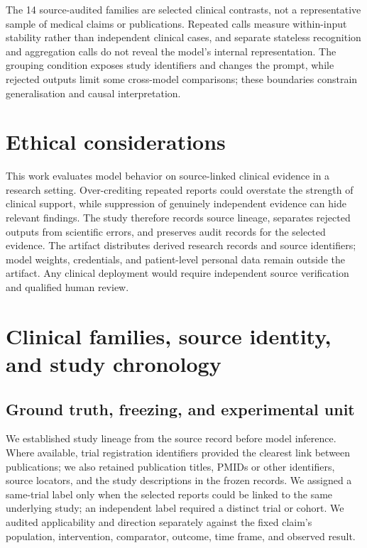\documentclass[11pt]{article}
\begin{document}
The 14 source-audited families are selected clinical contrasts, not a representative sample of medical claims or publications. Repeated calls measure within-input stability rather than independent clinical cases, and separate stateless recognition and aggregation calls do not reveal the model's internal representation. The grouping condition exposes study identifiers and changes the prompt, while rejected outputs limit some cross-model comparisons; these boundaries constrain generalisation and causal interpretation.

\section*{Ethical considerations}

This work evaluates model behavior on source-linked clinical evidence in a research setting. Over-crediting repeated reports could overstate the strength of clinical support, while suppression of genuinely independent evidence can hide relevant findings. The study therefore records source lineage, separates rejected outputs from scientific errors, and preserves audit records for the selected evidence. The artifact distributes derived research records and source identifiers; model weights, credentials, and patient-level personal data remain outside the artifact. Any clinical deployment would require independent source verification and qualified human review.



\appendix
\raggedbottom

\section{Clinical families, source identity, and study chronology}
\label{app:family-inventory}

\subsection{Ground truth, freezing, and experimental unit}
\label{app:study-chronology}

We established study lineage from the source record before model inference. Where available, trial registration identifiers provided the clearest link between publications; we also retained publication titles, PMIDs or other identifiers, source locators, and the study descriptions in the frozen records. We assigned a same-trial label only when the selected reports could be linked to the same underlying study; an independent label required a distinct trial or cohort. We audited applicability and direction separately against the fixed claim's population, intervention, comparator, outcome, time frame, and observed result.
\end{document}
